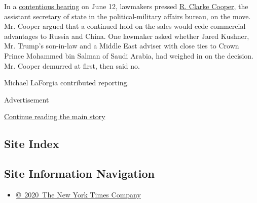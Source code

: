 In a
\href{https://www.nytimes.com/2019/06/12/us/politics/arms-sales-saudi-arabia.html}{contentious
hearing} on June 12, lawmakers pressed
\href{https://www.state.gov/assistant-secretary-of-state-for-political-military-affairs-r-clarke-cooper-travels-to-singapore-india-and-sri-lanka/}{R.
Clarke Cooper}, the assistant secretary of state in the
political-military affairs bureau, on the move. Mr. Cooper argued that a
continued hold on the sales would cede commercial advantages to Russia
and China. One lawmaker asked whether Jared Kushner, Mr. Trump's
son-in-law and a Middle East adviser with close ties to Crown Prince
Mohammed bin Salman of Saudi Arabia, had weighed in on the decision. Mr.
Cooper demurred at first, then said no.

Michael LaForgia contributed reporting.

Advertisement

\protect\hyperlink{after-bottom}{Continue reading the main story}

\hypertarget{site-index}{%
\subsection{Site Index}\label{site-index}}

\hypertarget{site-information-navigation}{%
\subsection{Site Information
Navigation}\label{site-information-navigation}}

\begin{itemize}
\tightlist
\item
  \href{https://help.nytimes.com/hc/en-us/articles/115014792127-Copyright-notice}{©~2020~The
  New York Times Company}
\end{itemize}

